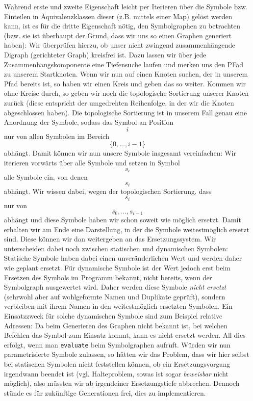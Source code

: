 Während erste und zweite Eigenschaft leicht per Iterieren über die Symbole bzw. Einteilen in Äquivalenzklassen dieser (z.B. mittels einer Map) gelöst werden kann, ist es für die dritte Eigenschaft nötig, den Symbolgraphen zu betrachten (bzw. sie ist überhaupt der Grund, dass wir uns so einen Graphen generiert haben): Wir überprüfen hierzu, ob unser nicht zwingend zusammenhängende Digraph (gerichteter Graph) kreisfrei ist. Dazu lassen wir über jede Zusammenhangskomponente eine Tiefensuche laufen und merken uns den PFad zu unserem Startknoten. Wenn wir nun auf einen Knoten suchen, der in unserem Pfad bereits ist, so haben wir einen Kreis und geben das so weiter. Kommen wir ohne Kreise durch, so geben wir noch die topologische Sortierung unserer Knoten zurück (diese entspricht der umgedrehten Reihenfolge, in der wir die Knoten abgeschlossen haben). Die topologische Sortierung ist in unserem Fall genau eine Anordnung der Symbole, sodass das Symbol an Position $$i$$ nur von allen Symbolen im Bereich $$\{0,...,i-1\}$$ abhängt. Damit können wir nun unsere Symbole insgesamt vereinfachen: Wir iterieren vorwärts über alle Symbole und setzen in Symbol $$s_i$$ alle Symbole ein, von denen $$s_i$$ abhängt. Wir wissen dabei, wegen der topologischen Sortierung, dass $$s_i$$ nur von $$s_0,...,s_{i-1}$$ abhängt und diese Symbole haben wir schon soweit wie möglich ersetzt. Damit erhalten wir am Ende eine Darstellung, in der die Symbole weitestmöglich ersetzt sind. Diese können wir dan weitergeben an das Ersetzungssystem. Wir unterscheiden dabei noch zwischen statischen und dynamischen Symbolen: Statische Symbole haben dabei einen unveränderlichen Wert und werden daher wie geplant ersetzt. Für dynamische Symbole ist der Wert jedoch erst beim Ersetzen des Symbols im Programm bekannt, nicht bereits, wenn der Symbolgraph ausgewertet wird. Daher werden diese Symbole \emph{nicht ersetzt} (sehrwohl aber auf wohlgeformte Namen und Duplikate geprüft), sondern verbleiben mit ihrem Namen in den weitestmöglich ersetzten Symbolen. Ein Einsatzzweck für solche dynamischen Symbole sind zum Beispiel relative Adressen: Da beim Generieren des Graphen nicht bekannt ist, bei welchen Befehlen das Symbol zum Einsatz kommt, kann es nicht ersetzt werden. All dies erfolgt, wenn man \texttt{evaluate} beim Symbolgraphen aufruft. Würden wir nun parametrisierte Symbole zulassen, so hätten wir das Problem, dass wir hier selbst bei statischen Symbolen nicht feststellen können, ob ein Ersetzungsvorgang irgendwann beendet ist (vgl. Halteproblem, sowas ist sogar \emph{beweisbar} nicht möglich), also müssten wir ab irgendeiner Ersetzungstiefe abbrechen. Dennoch stünde es für zukünftige Generationen frei, dies zu implementieren.

